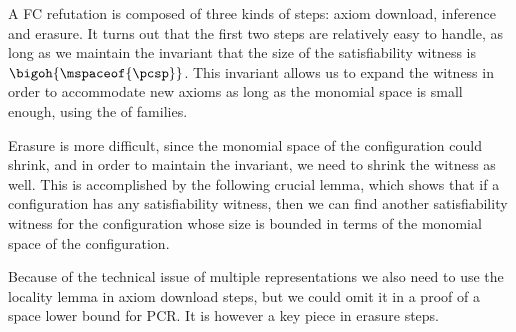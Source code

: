 \documentclass{toc}
\begin{document}
A FC refutation is composed of three kinds of steps: axiom download, inference and erasure. It turns out that the first two steps are relatively easy to handle, as long as we maintain the invariant that the size of the satisfiability witness is $\bigoh{\mspaceof{\pcsp}}$. This invariant allows us to expand the witness in order to accommodate new axioms as long as the monomial space is small enough, using the \extensionproperty of \kextendibleNok families.

Erasure is more difficult, since the monomial space of the configuration could shrink, and in order to maintain the invariant, we need to shrink the witness as well. This is accomplished by the following crucial lemma, which shows that if a configuration has any satisfiability witness, then we can find another satisfiability witness for the configuration whose size is bounded in terms of the monomial space of the configuration.

Because of the technical issue of multiple representations we also need to use the locality lemma in axiom download steps, but we could omit it in a proof of a space lower bound for PCR. It is however a key piece in erasure steps.
\end{document}
